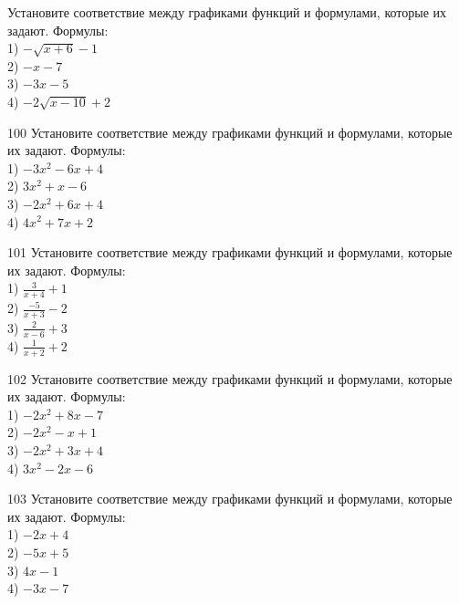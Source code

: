 \documentclass[4apaper]{article}
\begin{document}
\begin{taskBN}{99}
Установите соответствие между графиками функций и формулами, которые их задают. Формулы: \\1) $-\sqrt{x+6}-1$\\2) $-x-7$\\3) $-3x-5$\\4) $-2\sqrt{x-10}+2$
\end{taskBN}

\begin{taskBN}{100}
Установите соответствие между графиками функций и формулами, которые их задают. Формулы: \\1) $-3x^2-6x+4$\\2) $3x^2+x-6$\\3) $-2x^2+6x+4$\\4) $4x^2+7x+2$
\end{taskBN}

\begin{taskBN}{101}
Установите соответствие между графиками функций и формулами, которые их задают. Формулы: \\1) $\frac{3}{x+4}+1$\\2) $\frac{-5}{x+3}-2$\\3) $\frac{2}{x-6}+3$\\4) $\frac{1}{x+2}+2$
\end{taskBN}

\begin{taskBN}{102}
Установите соответствие между графиками функций и формулами, которые их задают. Формулы: \\1) $-2x^2+8x-7$\\2) $-2x^2-x+1$\\3) $-2x^2+3x+4$\\4) $3x^2-2x-6$
\end{taskBN}

\begin{taskBN}{103}
Установите соответствие между графиками функций и формулами, которые их задают. Формулы: \\1) $-2x+4$\\2) $-5x+5$\\3) $4x-1$\\4) $-3x-7$
\end{taskBN}
\end{document}

